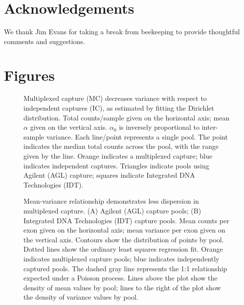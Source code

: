 \documentclass{bmcart}\usepackage[]{graphicx}\usepackage[]{color}
\begin{document}
\begin{backmatter}
\section*{Acknowledgements}%
We thank Jim Evans for taking a break from beekeeping to provide thoughtful comments and suggestions.


\section*{Figures}



\begin{figure}[h!]
  \centering
  \caption{Multiplexed capture (MC) decreases variance with respect to independent captures (IC), as estimated by fitting the Dirichlet distribution. Total counts/sample given on the horizontal axis; mean $\alpha$ given on the vertical axis. $\alpha_0$ is inversely proportional to inter-sample variance. Each line/point represents a single pool. The point indicates the median total counts across the pool, with the range given by the line. Orange indicates a multiplexed capture; blue indicates independent captures. Triangles indicate pools using Agilent (AGL) capture; squares indicate Integrated DNA Technologies (IDT).}
  \label{fig:alpha0}
\end{figure}



\begin{figure}[h!]
  \centering
  \caption{Mean-variance relationship demonstrates less dispersion in multiplexed capture. (A) Agilent (AGL) capture pools; (B) Integrated DNA Technologies (IDT) capture pools. Mean counts per exon given on the horizontal axis; mean variance per exon given on the vertical axis. Contours show the distribution of points by pool. Dotted lines show the ordinary least squares regression fit. Orange indicates multiplexed capture pools; blue indicates independently captured pools. The dashed gray line represents the 1:1 relationship expected under a Poisson process. Lines above the plot show the density of mean values by pool; lines to the right of the plot show the density of variance values by pool.}
  \label{fig:mnvr}
\end{figure}





\end{backmatter}
\end{document}
